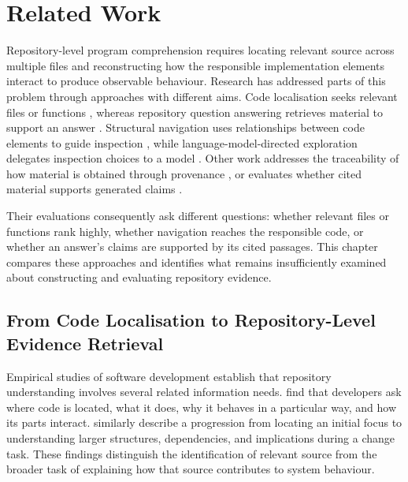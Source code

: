 \chapter{Related Work}\label{ch:related-work}

Repository-level program comprehension requires locating relevant source across multiple files and reconstructing how the responsible implementation elements interact to produce observable behaviour. Research has addressed parts of this problem through approaches with different aims. Code localisation seeks relevant files or functions \textcite{Zhou2012BugLocator}, whereas repository question answering retrieves material to support an answer \textcite{Peng2026SWEQA}. Structural navigation uses relationships between code elements to guide inspection \textcite{Petrenko2013DepIR}, while language-model-directed exploration delegates inspection choices to a model \textcite{Kang2024AutoFL}. Other work addresses the traceability of how material is obtained through provenance \textcite{W3C2013PROV}, or evaluates whether cited material supports generated claims \textcite{Gao2023ALCE}.

Their evaluations consequently ask different questions: whether relevant files or functions rank highly, whether navigation reaches the responsible code, or whether an answer's claims are supported by its cited passages. This chapter compares these approaches and identifies what remains insufficiently examined about constructing and evaluating repository evidence.

\section{From Code Localisation to Repository-Level Evidence Retrieval}\label{sec:from-code-localisation-to-repository-level-evidence-retrieval}

Empirical studies of software development establish that repository understanding involves several related information needs. \textcite{Ko2007InformationNeeds} find that developers ask where code is located, what it does, why it behaves in a particular way, and how its parts interact. \textcite{Sillito2008ProgrammingQuestions} similarly describe a progression from locating an initial focus to understanding larger structures, dependencies, and implications during a change task. These findings distinguish the identification of relevant source from the broader task of explaining how that source contributes to system behaviour.

